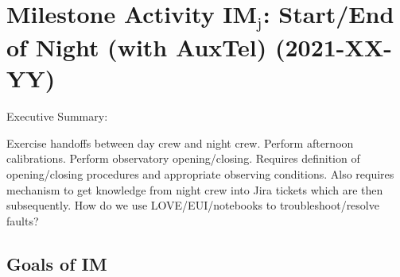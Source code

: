 \section{Milestone Activity IM\(_{\text{j}}\): Start/End of Night (with AuxTel)    (2021-XX-YY)}
\label{sec:orgb5f35b4}
Executive Summary:

Exercise handoffs between day crew and night crew. Perform afternoon calibrations.
Perform observatory opening/closing. 
Requires definition of opening/closing procedures and appropriate observing conditions.
Also requires mechanism to get knowledge from night crew into Jira tickets which are then subsequently.
How do we use LOVE/EUI/notebooks to troubleshoot/resolve faults?

\subsection{Goals of IM}

